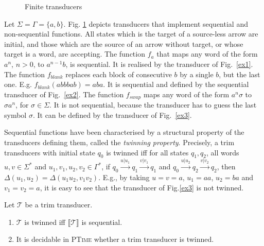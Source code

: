 \documentclass[envcountsame]{llncs}
\newcommand\inter[1]{\llbracket #1 \rrbracket}
\newcommand\trans[2]{\ensuremath{#1\mid #2}}
\newcommand\delay{\Delta}
\newcommand\tra{\mathcal{T}}
\begin{document}
\begin{figure}[t]
{
}
\vspace{-4mm}
\caption{Finite transducers}
\label{fig:transducers} 
\vspace{-6mm}
\end{figure}


Let $\Sigma = \Gamma = \{a,b\}$. Fig. \ref{fig:transducers} depicts transducers 
that implement sequential and non-sequential functions. All states
which is the target of a source-less arrow are initial, and those
which are the source of an arrow without target, or whose target is a
word, are accepting.  The function $f_{a}$ that maps any word of the
form $a^n$, $n>0$, to $a^{n-1}b$, is sequential. It is realised by the
transducer of Fig.~\ref{ex1}. The function $f_{blank}$ replaces each
block of consecutive $b$ by a single $b$, but the last
one. E.g. $f_{blank}(abbbab) = aba$. It is sequential and defined by
the sequential transducer of Fig.~\ref{ex2}. The function $f_{swap}$
maps any word of the form $a^n\sigma$ to $\sigma a^n$, for
$\sigma\in\Sigma$. It is not sequential, because the transducer
has to guess the last symbol $\sigma$. It can be defined by the
transducer of Fig.~\ref{ex3}. 



Sequential functions have been characterised by a structural property
of the transducers defining them, called the \emph{twinning
  property}.  Precisely, a trim transducers with initial state $q_0$
is twinned iff for all states $q_1,q_2$, all words $u,v\in\Sigma^*$ and
$u_1,v_1,u_2,v_2\in\Gamma^*$, if $q_0\xrightarrow{u |
    u_{1}}
q_1\xrightarrow{v | v_1} q_1$ and $q_0\xrightarrow{u | u_2}
q_2\xrightarrow{v | v_2} q_2$, then $\delay(u_1,u_2) =
\delay(u_1u_2,v_1v_2)$. E.g., by taking $u = v = a$, $u_1 =
aa$, $u_2 = ba$ and $v_1 = v_2 = a$, it is easy to see that 
the transducer of Fig.\ref{ex3} is not twinned.


\begin{theorem}
Let $\tra$ be a trim transducer.
\vspace{-2mm}
\begin{enumerate}
    \item $\tra$ is twinned iff $\inter{\tra}$ is sequential. 
    \item It is decidable in \textsc{PTime} whether a trim transducer
      is twinned. 
\end{enumerate}
\end{theorem}
\end{document}
